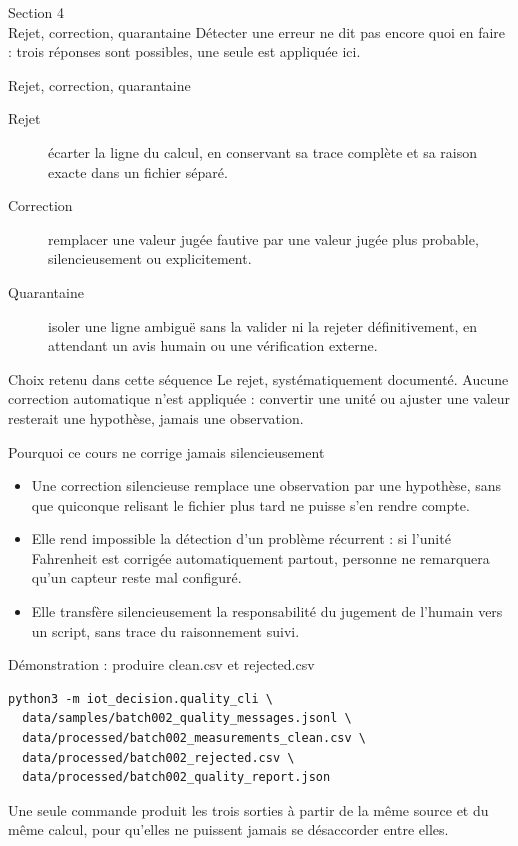 \documentclass[aspectratio=169]{beamer}
\begin{document}
\begin{frame}[plain]
  \centering
  \Huge Section 4\\[3mm]
  \Large Rejet, correction, quarantaine
  \vfill
  \normalsize Détecter une erreur ne dit pas encore quoi en faire : trois réponses sont possibles, une seule est appliquée ici.
\end{frame}

\begin{frame}{Rejet, correction, quarantaine}
  \begin{description}
    \item[Rejet] écarter la ligne du calcul, en conservant sa trace complète et sa raison exacte dans un fichier séparé.
    \item[Correction] remplacer une valeur jugée fautive par une valeur jugée plus probable, silencieusement ou explicitement.
    \item[Quarantaine] isoler une ligne ambiguë sans la valider ni la rejeter définitivement, en attendant un avis humain ou une vérification externe.
  \end{description}
  \begin{alertblock}{Choix retenu dans cette séquence}
    Le rejet, systématiquement documenté. Aucune correction automatique n'est appliquée : convertir une unité ou ajuster une valeur resterait une hypothèse, jamais une observation.
  \end{alertblock}
\end{frame}

\begin{frame}{Pourquoi ce cours ne corrige jamais silencieusement}
  \begin{itemize}
    \item Une correction silencieuse remplace une observation par une hypothèse, sans que quiconque relisant le fichier plus tard ne puisse s'en rendre compte.
    \item Elle rend impossible la détection d'un problème récurrent : si l'unité Fahrenheit est corrigée automatiquement partout, personne ne remarquera qu'un capteur reste mal configuré.
    \item Elle transfère silencieusement la responsabilité du jugement de l'humain vers un script, sans trace du raisonnement suivi.
  \end{itemize}
\end{frame}

\begin{frame}[fragile]{Démonstration : produire clean.csv et rejected.csv}
  \scriptsize
  \begin{verbatim}
python3 -m iot_decision.quality_cli \
  data/samples/batch002_quality_messages.jsonl \
  data/processed/batch002_measurements_clean.csv \
  data/processed/batch002_rejected.csv \
  data/processed/batch002_quality_report.json
  \end{verbatim}
  \normalsize
  Une seule commande produit les trois sorties à partir de la même source et du même calcul, pour qu'elles ne puissent jamais se désaccorder entre elles.
\end{frame}
\end{document}
